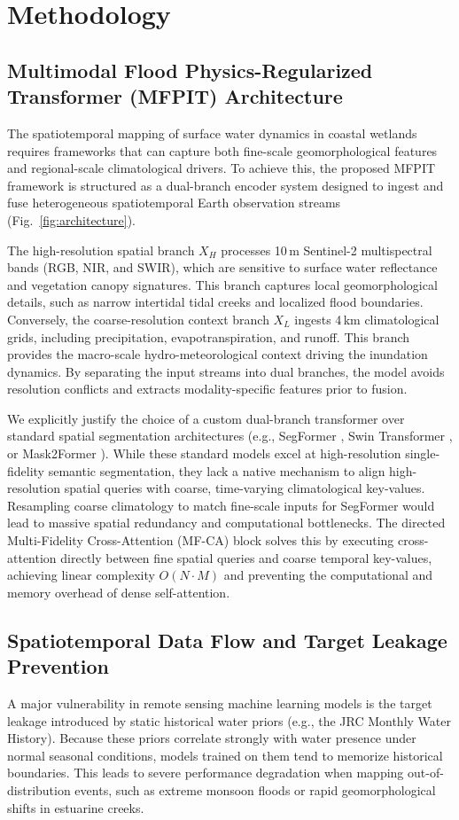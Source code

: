 \documentclass[journal]{IEEEtran}
\begin{document}
\section{Methodology}

\subsection{Multimodal Flood Physics-Regularized Transformer (MFPIT) Architecture}
The spatiotemporal mapping of surface water dynamics in coastal wetlands requires frameworks that can capture both fine-scale geomorphological features and regional-scale climatological drivers. To achieve this, the proposed MFPIT framework is structured as a dual-branch encoder system designed to ingest and fuse heterogeneous spatiotemporal Earth observation streams (Fig.~\ref{fig:architecture}). 

The high-resolution spatial branch $X_H$ processes 10\,m Sentinel-2 multispectral bands (RGB, NIR, and SWIR), which are sensitive to surface water reflectance and vegetation canopy signatures. This branch captures local geomorphological details, such as narrow intertidal tidal creeks and localized flood boundaries. Conversely, the coarse-resolution context branch $X_L$ ingests 4\,km climatological grids, including precipitation, evapotranspiration, and runoff. This branch provides the macro-scale hydro-meteorological context driving the inundation dynamics. By separating the input streams into dual branches, the model avoids resolution conflicts and extracts modality-specific features prior to fusion.

We explicitly justify the choice of a custom dual-branch transformer over standard spatial segmentation architectures (e.g., SegFormer \cite{xie_segformer_2021}, Swin Transformer \cite{liu_swin_2021}, or Mask2Former \cite{cheng_masked_2022}). While these standard models excel at high-resolution single-fidelity semantic segmentation, they lack a native mechanism to align high-resolution spatial queries with coarse, time-varying climatological key-values. Resampling coarse climatology to match fine-scale inputs for SegFormer would lead to massive spatial redundancy and computational bottlenecks. The directed Multi-Fidelity Cross-Attention (MF-CA) block solves this by executing cross-attention directly between fine spatial queries and coarse temporal key-values, achieving linear complexity $O(N \cdot M)$ and preventing the computational and memory overhead of dense self-attention.

\subsection{Spatiotemporal Data Flow and Target Leakage Prevention}
A major vulnerability in remote sensing machine learning models is the target leakage introduced by static historical water priors (e.g., the JRC Monthly Water History). Because these priors correlate strongly with water presence under normal seasonal conditions, models trained on them tend to memorize historical boundaries. This leads to severe performance degradation when mapping out-of-distribution events, such as extreme monsoon floods or rapid geomorphological shifts in estuarine creeks.
\end{document}
